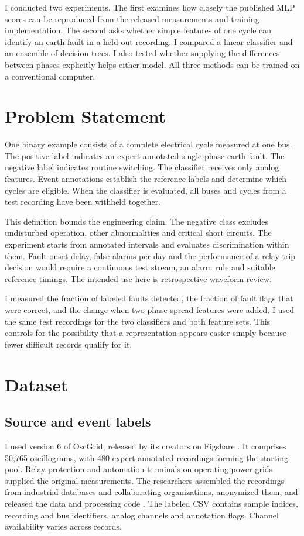 \documentclass[11pt,conference,letterpaper]{IEEEtran}
\begin{document}
I conducted two experiments. The first examines how closely the published MLP scores can be reproduced from the released measurements and training implementation. The second asks whether simple features of one cycle can identify an earth fault in a held-out recording. I compared a linear classifier and an ensemble of decision trees. I also tested whether supplying the differences between phases explicitly helps either model. All three methods can be trained on a conventional computer.

\section{Problem Statement}
One binary example consists of a complete electrical cycle measured at one bus. The positive label indicates an expert-annotated single-phase earth fault. The negative label indicates routine switching. The classifier receives only analog features. Event annotations establish the reference labels and determine which cycles are eligible. When the classifier is evaluated, all buses and cycles from a test recording have been withheld together.

This definition bounds the engineering claim. The negative class excludes undisturbed operation, other abnormalities and critical short circuits. The experiment starts from annotated intervals and evaluates discrimination within them. Fault-onset delay, false alarms per day and the performance of a relay trip decision would require a continuous test stream, an alarm rule and suitable reference timings. The intended use here is retrospective waveform review.

I measured the fraction of labeled faults detected, the fraction of fault flags that were correct, and the change when two phase-spread features were added. I used the same test recordings for the two classifiers and both feature sets. This controls for the possibility that a representation appears easier simply because fewer difficult records qualify for it.

\section{Dataset}
\subsection{Source and event labels}
I used version 6 of OscGrid, released by its creators on Figshare \cite{data}. It comprises 50,765 oscillograms, with 480 expert-annotated recordings forming the starting pool. Relay protection and automation terminals on operating power grids supplied the original measurements. The researchers assembled the recordings from industrial databases and collaborating organizations, anonymized them, and released the data and processing code \cite{osc,code}. The labeled CSV contains sample indices, recording and bus identifiers, analog channels and annotation flags. Channel availability varies across records.
\end{document}
